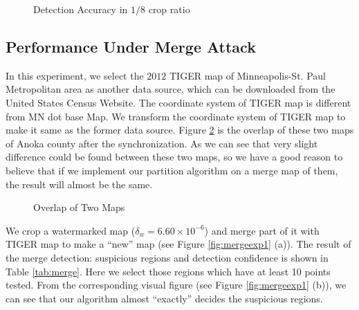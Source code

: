 \begin{figure}[h]
\centering
{}
\caption{Detection Accuracy in $1/8$ crop ratio}
\label{fig:mdelta}
\end{figure}

\subsection{Performance Under Merge Attack}


In this experiment, we select the $2012$ TIGER map of Minneapolis-St. Paul 
Metropolitan area as another data source, which can be downloaded from the 
United States Census Website\cite{tigerurl}. The coordinate system of TIGER 
map is different from MN dot base Map. We transform the coordinate system of 
TIGER map to make it same as the former data source. Figure \ref{fig:17} is 
the overlap of these two maps of Anoka county after the synchronization. 
As we can see that very slight difference could be found between these two maps, 
so we have a good reason to believe that if we implement our partition algorithm 
on a merge map of them, the result will almost be the same.


\begin{figure}[th]
\centering
{}
\caption{Overlap of Two Maps}
\label{fig:17}
\end{figure}
We crop a watermarked map ($\delta_w = 6.60 \times 10^{-6}$) and merge part of it with TIGER 
map to make a ``new'' map (see Figure \ref{fig:mergeexp1} (a)). The result of the 
merge detection: suspicious regions and detection confidence is shown in Table 
\ref{tab:merge}. Here we select those regions which have at least 10 points tested. 
From the corresponding visual figure (see Figure \ref{fig:mergeexp1} (b)), we can see 
that our algorithm almost ``exactly'' decides the suspicious regions. 

